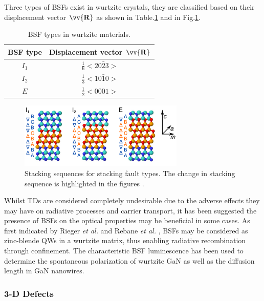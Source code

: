 Three types of BSFs exist in wurtzite crystals, they are classified based on their displacement vector $\mathbf{\vv{R}}$ as shown in Table.\ref{tab1.5} and in Fig.\ref{bsf_type}.

\begin{table}[h]
	\centering
	\begin{tabular}{cc}
		\centering
		\textbf{BSF type}& \textbf{Displacement vector $\mathbf{\vv{R}}$ } \\
		\hline
		$I_{1}$  & $\frac{1}{6}<20\bar{2}3>$ \\
		$I_{2}$ & $\frac{1}{3}<10\bar{1}0>$ \\
		$E$  & $\frac{1}{2}<0001>$ \\
		\hline
		
	\end{tabular}
	\caption{BSF types in wurtzite materials.}
	\label{tab1.5}
\end{table}
\FloatBarrier

\begin{figure}[h]
	\centering
	\includegraphics[width=0.7\textwidth]{Figs/Ch1/bsf_type.png}
	\caption {Stacking sequences for stacking fault types. The change in stacking sequence is highlighted in the figures \cite{Lahnemann2014}.}
	\label{bsf_type}
\end{figure}
\FloatBarrier 

Whilst TDs are considered completely undesirable due to the adverse effects they may have on radiative processes and carrier transport, it has been suggested the presence of BSFs on the optical properties may be beneficial in some cases. As first indicated by Rieger {\it et al.} \cite{Rieger1996} and Rebane {\it et al.} \cite{Rebane1997}, BSFs may be considered as zinc-blende QWs in a wurtzite matrix, thus enabling radiative recombination through confinement. The characteristic BSF luminescence has been used to determine the spontaneous polarization of wurtzite GaN \cite{Lahnemann2012} as well as the diffusion length in GaN nanowires\cite{Nogues2014}.

\subsubsection{3-D Defects}

